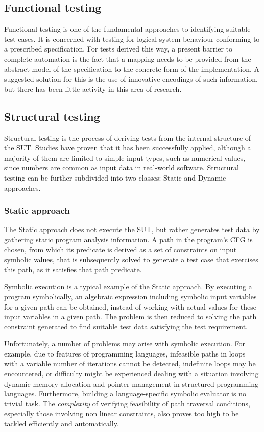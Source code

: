 \documentclass{icldt}
\numberwithin{equation}{section}       %
\begin{document}
\subsection{Functional testing}
Functional testing is one of the fundamental approaches to identifying suitable test cases. It is concerned with testing for logical system behaviour conforming to a prescribed specification. For tests derived this way, a present barrier to complete automation is the fact that a mapping needs to be provided from the abstract model of the specification to the concrete form of the implementation. A suggested solution for this is the use of innovative encodings of such information, but there has been little activity in this area of research.

\subsection{Structural testing}
Structural testing is the process of deriving tests from the internal structure of the SUT. Studies have proven that it has been successfully applied, although a majority of them are limited to simple input types, such as numerical values, since numbers are common as input data in real-world software. Structural testing can be further subdivided into two classes: Static and Dynamic approaches.

	\subsubsection{Static approach}
The Static approach does not execute the SUT, but rather generates test data by gathering static program analysis information. A path in the program's CFG is chosen, from which its predicate is derived as a set of constraints on input symbolic values, that is subsequently solved to generate a test case that exercises this path, as it satisfies that path predicate.

Symbolic execution is a typical example of the Static approach. By executing a program symbolically, an algebraic expression including symbolic input variables for a given path can be obtained, instead of working with actual values for these input variables in a given path. The problem is then reduced to solving the path constraint generated to find suitable test data satisfying the test requirement.

Unfortunately, a number of problems may arise with symbolic execution. For example, due to features of programming languages, infeasible paths in loops with a variable number of iterations cannot be detected, indefinite loops may be encountered, or difficulty might be experienced dealing with a situation involving dynamic memory allocation and pointer management in structured programming languages. Furthermore, building a language-specific symbolic evaluator is no trivial task. The \emph{complexity} of verifying feasibility of path traversal conditions, especially those involving non linear constraints, also proves too high to be tackled efficiently and automatically.
\end{document}

